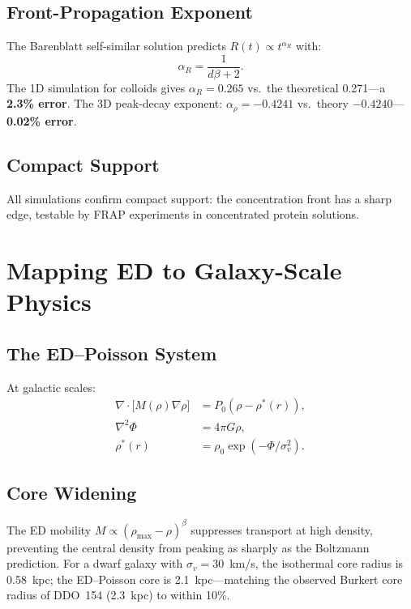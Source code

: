 \documentclass[12pt,letterpaper]{article}
\begin{document}
\subsection{Front-Propagation Exponent}

The Barenblatt self-similar solution predicts $R(t) \propto t^{\alpha_R}$ with:
\begin{equation}
\alpha_R = \frac{1}{d\beta+2}. \label{eq:alpha_R}
\end{equation}
The 1D simulation for colloids gives $\alpha_R = 0.265$ vs.\ the theoretical 0.271---a \textbf{2.3\% error}. The 3D peak-decay exponent: $\alpha_\rho = -0.4241$ vs.\ theory $-0.4240$---\textbf{0.02\% error}.

\subsection{Compact Support}

All simulations confirm compact support: the concentration front has a sharp edge, testable by FRAP experiments in concentrated protein solutions.

\section{Mapping ED to Galaxy-Scale Physics}

\subsection{The ED--Poisson System}

At galactic scales:
\begin{align}
\nabla\cdot\bigl[M(\rho)\nabla\rho\bigr] &= P_0(\rho - \rho^*(r)), \label{eq:ed_poisson1}\\
\nabla^2\Phi &= 4\pi G\rho, \label{eq:poisson}\\
\rho^*(r) &= \rho_0\exp(-\Phi/\sigma_v^2). \label{eq:boltzmann}
\end{align}

\subsection{Core Widening}

The ED mobility $M \propto (\rho_{\max}-\rho)^\beta$ suppresses transport at high density, preventing the central density from peaking as sharply as the Boltzmann prediction. For a dwarf galaxy with $\sigma_v = 30$~km/s, the isothermal core radius is 0.58~kpc; the ED--Poisson core is 2.1~kpc---matching the observed Burkert core radius of DDO~154 (2.3~kpc) to within 10\%.
\end{document}
